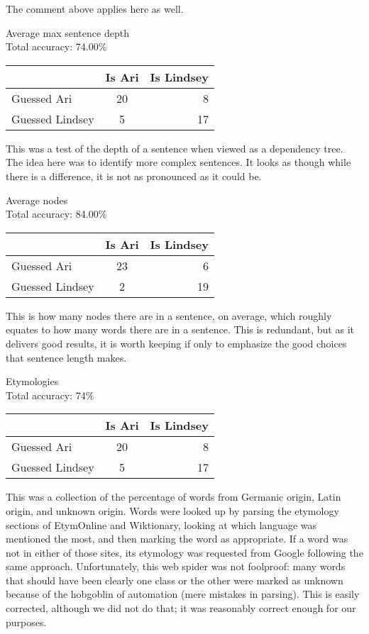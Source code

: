 \documentclass[twocolumn]{article}
\begin{document}
  The comment above applies here as well.

  \begin{center}
    Average max sentence depth \\
    Total accuracy: 74.00\%
    \begin{tabular}{ l || c | r }
      \hline
      & Is Ari & Is Lindsey \\ \hline
      Guessed Ari & 20 & 8 \\ \hline
      Guessed Lindsey & 5 & 17 \\
      \hline
    \end{tabular}
  \end{center}
  
  This was a test of the depth of a sentence when viewed as a dependency tree. The idea here was to identify more complex sentences. It looks as though while there is a difference, it is not as pronounced as it could be.

  \begin{center}
    Average nodes \\
    Total accuracy: 84.00\%
    \begin{tabular}{ l || c | r }
      \hline
      & Is Ari & Is Lindsey \\ \hline
      Guessed Ari & 23 & 6 \\ \hline
      Guessed Lindsey & 2 & 19 \\
      \hline
    \end{tabular}
  \end{center}
  
  This is how many nodes there are in a sentence, on average, which roughly equates to how many words there are in a sentence. This is redundant, but as it delivers good results, it is worth keeping if only to emphasize the good choices that sentence length makes.
  
  \begin{center}
    Etymologies \\
    Total accuracy: 74\%
    \begin{tabular}{ l || c | r }
      \hline
      & Is Ari & Is Lindsey \\ \hline
      Guessed Ari & 20 & 8 \\ \hline
      Guessed Lindsey & 5 & 17 \\
      \hline
    \end{tabular}
  \end{center}
  
  This was a collection of the percentage of words from Germanic origin, Latin origin, and unknown origin. Words were looked up by parsing the etymology sections of EtymOnline and Wiktionary, looking at which language was mentioned the most, and then marking the word as appropriate. If a word was not in either of those sites, its etymology was requested from Google following the same approach. Unfortunately, this web spider was not foolproof: many words that should have been clearly one class or the other were marked as unknown because of the hobgoblin of automation (mere mistakes in parsing). This is easily corrected, although we did not do that; it was reasonably correct enough for our purposes.
  
\end{document}
